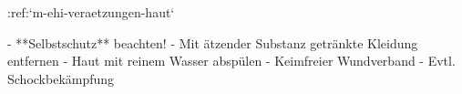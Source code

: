 :ref:`m-ehi-veraetzungen-haut`
\begin{itemize}
   -   **Selbstschutz** beachten!
    -   Mit ätzender Substanz getränkte Kleidung entfernen
    -   Haut mit reinem Wasser abspülen
    -   Keimfreier Wundverband
    -   Evtl. Schockbekämpfung
\end{itemize}
